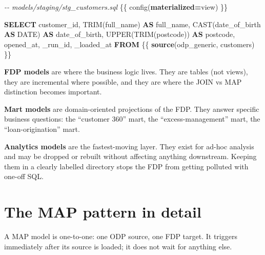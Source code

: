\documentclass[
  11pt,
  british,
  oneside]{book}
\newenvironment{Shaded}{\begin{snugshade}}{\end{snugshade}}
\newcommand{\CommentTok}[1]{\textcolor[rgb]{0.56,0.35,0.01}{\textit{#1}}}
\newcommand{\DataTypeTok}[1]{\textcolor[rgb]{0.13,0.29,0.53}{#1}}
\newcommand{\FunctionTok}[1]{\textcolor[rgb]{0.00,0.00,0.00}{#1}}
\newcommand{\KeywordTok}[1]{\textcolor[rgb]{0.13,0.29,0.53}{\textbf{#1}}}
\newcommand{\NormalTok}[1]{#1}
\newcommand{\OperatorTok}[1]{\textcolor[rgb]{0.81,0.36,0.00}{\textbf{#1}}}
\newcommand{\StringTok}[1]{\textcolor[rgb]{0.31,0.60,0.02}{#1}}
\begin{document}
\begin{Shaded}
\begin{Highlighting}[]
\CommentTok{{-}{-} models/staging/stg\_customers.sql}
\NormalTok{\{\{ config(}\KeywordTok{materialized}\OperatorTok{=}\StringTok{\textquotesingle{}view\textquotesingle{}}\NormalTok{) \}\}}

\KeywordTok{SELECT}
\NormalTok{    customer\_id,}
    \FunctionTok{TRIM}\NormalTok{(full\_name)      }\KeywordTok{AS}\NormalTok{ full\_name,}
    \FunctionTok{CAST}\NormalTok{(date\_of\_birth }\KeywordTok{AS} \DataTypeTok{DATE}\NormalTok{) }\KeywordTok{AS}\NormalTok{ date\_of\_birth,}
    \FunctionTok{UPPER}\NormalTok{(}\FunctionTok{TRIM}\NormalTok{(postcode)) }\KeywordTok{AS}\NormalTok{ postcode,}
\NormalTok{    opened\_at,}
\NormalTok{    \_run\_id,}
\NormalTok{    \_loaded\_at}
\KeywordTok{FROM}\NormalTok{ \{\{ }\KeywordTok{source}\NormalTok{(}\StringTok{\textquotesingle{}odp\_generic\textquotesingle{}}\NormalTok{, }\StringTok{\textquotesingle{}customers\textquotesingle{}}\NormalTok{) \}\}}
\end{Highlighting}
\end{Shaded}

\textbf{FDP models} are where the business logic lives. They are tables
(not views), they are incremental where possible, and they are where the
JOIN vs MAP distinction becomes important.

\textbf{Mart models} are domain-oriented projections of the FDP. They
answer specific business questions: the ``customer 360'' mart, the
``excess-management'' mart, the ``loan-origination'' mart.

\textbf{Analytics models} are the fastest-moving layer. They exist for
ad-hoc analysis and may be dropped or rebuilt without affecting anything
downstream. Keeping them in a clearly labelled directory stops the FDP
from getting polluted with one-off SQL.

\hypertarget{the-map-pattern-in-detail}{%
\section{The MAP pattern in detail}\label{the-map-pattern-in-detail}}

A MAP model is one-to-one: one ODP source, one FDP target. It triggers
immediately after its source is loaded; it does not wait for anything
else.
\end{document}
